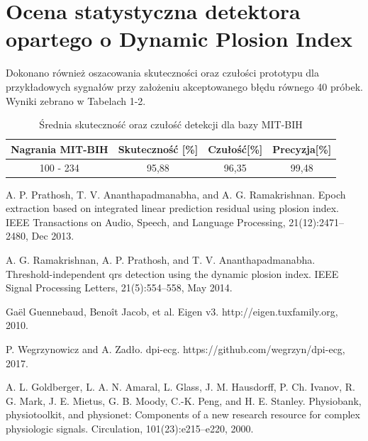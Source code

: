 \documentclass[a4paper,10pt]{article} %
\begin{document}
\section{Ocena statystyczna detektora opartego o Dynamic Plosion Index}
Dokonano również oszacowania skuteczności oraz czułości prototypu dla przykładowych sygnałów przy założeniu akceptowanego błędu równego 40 próbek. Wyniki zebrano w Tabelach 1-2.
\FloatBarrier
\begin{table}[h]
\centering
\caption{Średnia skuteczność oraz czułość detekcji dla bazy MIT-BIH}
\label{table_1}
\begin{tabular}{|c|c|c|c|}
	\hline
	Nagrania MIT-BIH & Skuteczność [\%] & Czułość[\%] & Precyzja[\%] \\
	\hline
	100 - 234 & 95,88 & 96,35 &  99,48  \\ 
	\hline
\end{tabular}
\end{table}

%
%

\begin{thebibliography}{5}
A. P. Prathosh, T. V. Ananthapadmanabha, and A. G. Ramakrishnan. Epoch extraction based on
integrated linear prediction residual using plosion index. IEEE Transactions on Audio, Speech, and
Language Processing, 21(12):2471–2480, Dec 2013.

A. G. Ramakrishnan, A. P. Prathosh, and T. V. Ananthapadmanabha. Threshold-independent qrs
detection using the dynamic plosion index. IEEE Signal Processing Letters, 21(5):554–558, May 2014.
 
Gaël Guennebaud, Benoît Jacob, et al. Eigen v3. http://eigen.tuxfamily.org, 2010.

P. Wegrzynowicz and A. Zadło. dpi-ecg. https://github.com/wegrzyn/dpi-ecg, 2017.

A. L. Goldberger, L. A. N. Amaral, L. Glass, J. M. Hausdorff, P. Ch. Ivanov, R. G. Mark, J. E. Mietus,
G. B. Moody, C.-K. Peng, and H. E. Stanley. Physiobank, physiotoolkit, and physionet: Components
of a new research resource for complex physiologic signals. Circulation, 101(23):e215–e220, 2000.

\end{thebibliography}
\end{document}
